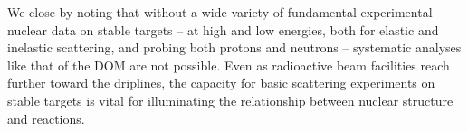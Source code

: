 We close by noting that without a wide variety of fundamental experimental nuclear data on stable
targets -- at high and low energies, both for elastic and inelastic scattering,
and probing both protons and neutrons -- systematic analyses like that of the DOM are not possible.
Even as radioactive beam facilities reach further toward the driplines, the capacity for basic 
scattering experiments on stable targets is vital for illuminating the relationship between nuclear 
structure and reactions.
